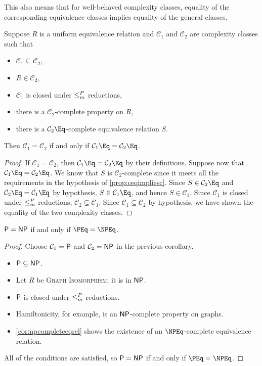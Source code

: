 This also means that for well-behaved complexity classes, equality of the corresponding equivalence classes implies equality of the general classes.

\begin{proposition}
  Suppose $R$ is a uniform equivalence relation and $\mathcal{C}_1$ and $\mathcal{C}_2$ are complexity classes such that
  \begin{itemize}
  \item $\mathcal{C}_1 \subseteq \mathcal{C}_2$,
  \item $R \in \mathcal{C}_2$,
  \item $\mathcal{C}_1$ is closed under $\mor$ reductions,
  \item there is a $\mathcal{C}_2$-complete property on $R$,
  \item there is a $\mathcal{C}_2\Eq$-complete equivalence relation $S$.
  \end{itemize}
  Then $\mathcal{C}_1 = \mathcal{C}_2$ if and only if $\mathcal{C}_1\Eq = \mathcal{C}_2\Eq$.
\end{proposition}
\begin{proof}
  If $\mathcal{C}_1 = \mathcal{C}_2$, then $\mathcal{C}_1\Eq = \mathcal{C}_2\Eq$ by their definitions.
  Suppose now that $\mathcal{C}_1\Eq = \mathcal{C}_2\Eq$.
  We know that $S$ is $\mathcal{C}_2$-complete since it meets all the requirements in the hypothesis of \autoref{prop:ceqimpliesc}.
  Since $S \in \mathcal{C}_2\Eq$ and $\mathcal{C}_2\Eq = \mathcal{C}_1\Eq$ by hypothesis, $S \in \mathcal{C}_1\Eq$, and hence $S \in \mathcal{C}_1$.
  Since $\mathcal{C}_1$ is closed under $\mor$ reductions, $\mathcal{C}_2 \subseteq \mathcal{C}_1$.
  Since $\mathcal{C}_1 \subseteq \mathcal{C}_2$ by hypothesis, we have shown the equality of the two complexity classes.
\end{proof}

\begin{corollary}\label{cor:pnppeqnpeq}
  $\P = \NP$ if and only if $\PEq = \NPEq$.
\end{corollary}
\begin{proof}
  Choose $\mathcal{C}_1 = \P$ and $\mathcal{C}_2 = \NP$ in the previous corollary.
  \begin{itemize}
  \item $\P \subseteq \NP$.
  \item Let $R$ be \textsc{Graph Isomorphism}; it is in $\NP$.
  \item $\P$ is closed under $\mor$ reductions.
  \item Hamiltonicity, for example, is an $\NP$-complete property on graphs.
  \item \autoref{cor:npcompleteeqrel} shows the existence of an $\NPEq$-complete equivalence relation.
  \end{itemize}
  All of the conditions are satisfied, so $\P = \NP$ if and only if $\PEq = \NPEq$.
\end{proof}

